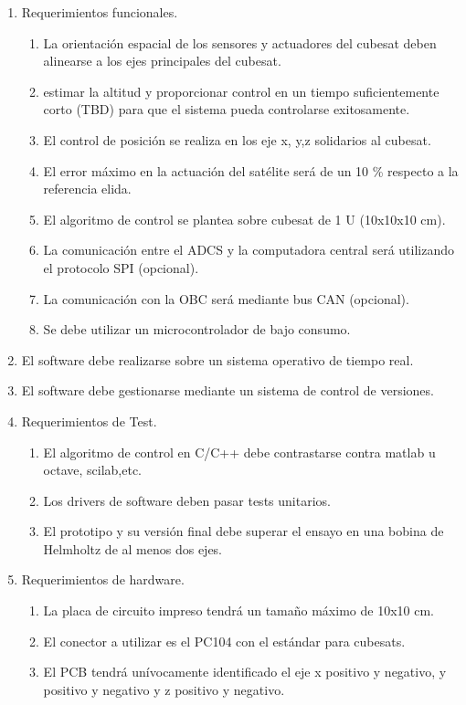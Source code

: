 \documentclass[
11pt, %
]{charter}
\begin{document}
\begin{enumerate}
	\item Requerimientos funcionales.
		\begin{enumerate}
			\item La orientación espacial de los sensores y actuadores del cubesat deben alinearse a los ejes principales del cubesat.
			\item  estimar la altitud y proporcionar control en un tiempo suficientemente corto (TBD) para que el sistema pueda controlarse exitosamente. 
			\item El control de posición se realiza en los eje x, y,z solidarios al cubesat.  
			\item El error máximo en la actuación del satélite será de un 10 \% respecto a la referencia elida. 
			\item El algoritmo de control se plantea sobre cubesat de 1 U (10x10x10 cm).
			\item La comunicación entre el ADCS y la computadora central será utilizando el protocolo SPI (opcional).  %
			\item La comunicación con la OBC será mediante bus CAN (opcional).  
			\item Se debe utilizar un microcontrolador de bajo consumo. 
		\end{enumerate}
	\item El software debe realizarse sobre un sistema operativo de tiempo real.   
	\item El software debe gestionarse mediante un sistema de control de versiones. 
	\item Requerimientos de Test.
		\begin{enumerate}
			\item  El algoritmo de control en C/C++ debe contrastarse contra matlab u octave, scilab,etc. 
			\item  Los drivers de software deben pasar tests unitarios. 
			\item  El prototipo y su versión final debe superar el ensayo en una bobina de Helmholtz de al menos dos ejes.  
		\end{enumerate}
\item Requerimientos de hardware.
	\begin{enumerate}
		\item La placa de circuito impreso tendrá un tamaño máximo de 10x10 cm.
		\item El conector a utilizar es el PC104 con el estándar para cubesats. 
		\item El PCB tendrá unívocamente identificado el eje x positivo y negativo, y positivo y negativo y z positivo y negativo. 
	\end{enumerate}


\end{enumerate}
\end{document}

